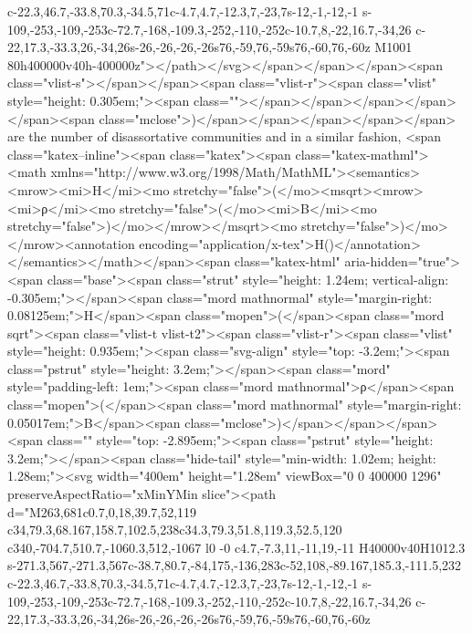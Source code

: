 c-22.3,46.7,-33.8,70.3,-34.5,71c-4.7,4.7,-12.3,7,-23,7s-12,-1,-12,-1
s-109,-253,-109,-253c-72.7,-168,-109.3,-252,-110,-252c-10.7,8,-22,16.7,-34,26
c-22,17.3,-33.3,26,-34,26s-26,-26,-26,-26s76,-59,76,-59s76,-60,76,-60z
M1001 80h400000v40h-400000z"></path></svg></span></span></span><span class="vlist-s">​</span></span><span class="vlist-r"><span class="vlist" style="height: 0.305em;"><span class=""></span></span></span></span></span><span class="mclose">)</span></span></span></span></span> are the number of disassortative communities and in a similar fashion, <span class="katex--inline"><span class="katex"><span class="katex-mathml"><math xmlns="http://www.w3.org/1998/Math/MathML"><semantics><mrow><mi>H</mi><mo stretchy="false">(</mo><msqrt><mrow><mi>ρ</mi><mo stretchy="false">(</mo><mi>B</mi><mo stretchy="false">)</mo></mrow></msqrt><mo stretchy="false">)</mo></mrow><annotation encoding="application/x-tex">H()</annotation></semantics></math></span><span class="katex-html" aria-hidden="true"><span class="base"><span class="strut" style="height: 1.24em; vertical-align: -0.305em;"></span><span class="mord mathnormal" style="margin-right: 0.08125em;">H</span><span class="mopen">(</span><span class="mord sqrt"><span class="vlist-t vlist-t2"><span class="vlist-r"><span class="vlist" style="height: 0.935em;"><span class="svg-align" style="top: -3.2em;"><span class="pstrut" style="height: 3.2em;"></span><span class="mord" style="padding-left: 1em;"><span class="mord mathnormal">ρ</span><span class="mopen">(</span><span class="mord mathnormal" style="margin-right: 0.05017em;">B</span><span class="mclose">)</span></span></span><span class="" style="top: -2.895em;"><span class="pstrut" style="height: 3.2em;"></span><span class="hide-tail" style="min-width: 1.02em; height: 1.28em;"><svg width="400em" height="1.28em" viewBox="0 0 400000 1296" preserveAspectRatio="xMinYMin slice"><path d="M263,681c0.7,0,18,39.7,52,119
c34,79.3,68.167,158.7,102.5,238c34.3,79.3,51.8,119.3,52.5,120
c340,-704.7,510.7,-1060.3,512,-1067
l0 -0
c4.7,-7.3,11,-11,19,-11
H40000v40H1012.3
s-271.3,567,-271.3,567c-38.7,80.7,-84,175,-136,283c-52,108,-89.167,185.3,-111.5,232
c-22.3,46.7,-33.8,70.3,-34.5,71c-4.7,4.7,-12.3,7,-23,7s-12,-1,-12,-1
s-109,-253,-109,-253c-72.7,-168,-109.3,-252,-110,-252c-10.7,8,-22,16.7,-34,26
c-22,17.3,-33.3,26,-34,26s-26,-26,-26,-26s76,-59,76,-59s76,-60,76,-60z
